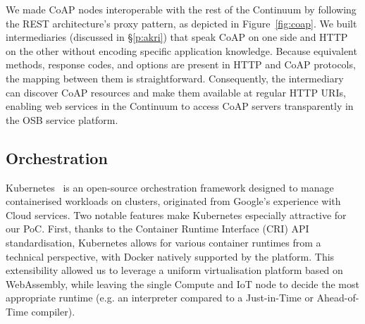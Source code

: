 
We made CoAP nodes interoperable with the rest of the Continuum by following the REST architecture's proxy pattern, as depicted in Figure~\ref{fig:coap}. We built intermediaries (discussed in §\ref{p:akri}) that speak CoAP on one side and HTTP on the other without encoding specific application knowledge. Because equivalent methods, response codes, and options are present in HTTP and CoAP protocols, the mapping between them is straightforward. Consequently, the intermediary can discover CoAP resources and make them available at regular HTTP URIs, enabling web services in the Continuum to access CoAP servers transparently in the OSB service platform.


\subsection{Orchestration}

Kubernetes~\cite{kubernetes} is an open-source orchestration framework designed to manage containerised workloads on clusters, originated from Google's experience with Cloud services. Two notable features make Kubernetes especially attractive for our PoC. 
First, thanks to the Container Runtime Interface (CRI) API standardisation, Kubernetes allows for various container runtimes from a technical perspective, with Docker natively supported by the platform. This extensibility allowed us to leverage a uniform virtualisation platform based on WebAssembly, while leaving the single Compute and IoT node to decide the most appropriate runtime (e.g. an interpreter compared to a Just-in-Time or Ahead-of-Time compiler).

